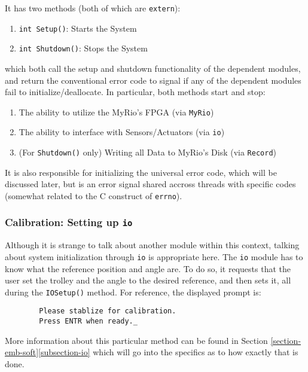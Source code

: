 \documentclass[letterpaper]{article}
\begin{document}
It has two methods (both of which are \texttt{extern}):
\begin{enumerate}
    \item \texttt{int Setup()}: Starts the System
    \item \texttt{int Shutdown()}: Stops the System
\end{enumerate}
which both call the setup and shutdown functionality of the dependent modules, and return the conventional error code to signal if any of the dependent modules fail to initialize/deallocate. In particular, both methods start and stop:
\begin{enumerate}
    \item The ability to utilize the MyRio's FPGA (via \texttt{MyRio})
    \item The ability to interface with Sensors/Actuators (via \texttt{io})
    \item (For \texttt{Shutdown()} only) Writing all Data to MyRio's Disk (via \texttt{Record})
\end{enumerate}

It is also responsible for initializing the universal error code, which will be discussed later, but is an error signal shared accross threads with specific codes (somewhat related to the C construct of \texttt{errno}).

\subsubsection{Calibration: Setting up \texttt{io}}
Although it is strange to talk about another module within this context, talking about system initialization through \texttt{io} is appropriate here. The \texttt{io} module has to know what the reference position and angle are. To do so, it requests that the user set the trolley and the angle to the desired reference, and then sets it, all during the \texttt{IOSetup()} method. For reference, the displayed prompt is:

\begin{center}
    \begin{lstlisting}
        Please stablize for calibration.
        Press ENTR when ready._
    \end{lstlisting}
\end{center}
More information about this particular method can be found in Section \ref{section-emb-soft}\ref{subsection-io} which will go into the specifics as to how exactly that is done.
\end{document}
